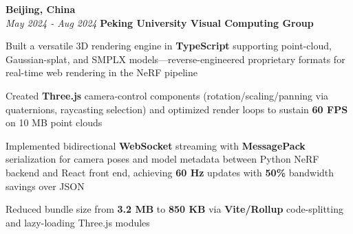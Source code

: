 \vspace{0.2cm}

\begin{twocolentry}{
    \textbf{Beijing, China} \\
    \textit{May 2024 - Aug 2024}
}{
    \textbf{Peking University Visual Computing Group} \\
}
\end{twocolentry}
\begin{onecolentry}
    \begin{highlights}
        \item Built a versatile 3D rendering engine in \textbf{TypeScript} supporting point-cloud, Gaussian-splat, and SMPLX models—reverse-engineered proprietary formats for real-time web rendering in the NeRF pipeline
        \item Created \textbf{Three.js} camera-control components (rotation/scaling/panning via quaternions, raycasting selection) and optimized render loops to sustain \textbf{60 FPS} on 10 MB point clouds
        \item Implemented bidirectional \textbf{WebSocket} streaming with \textbf{MessagePack} serialization for camera poses and model metadata between Python NeRF backend and React front end, achieving \textbf{60 Hz} updates with \textbf{50\%} bandwidth savings over JSON
        \item Reduced bundle size from \textbf{3.2 MB} to \textbf{850 KB} via \textbf{Vite/Rollup} code-splitting and lazy-loading Three.js modules
    \end{highlights}
\end{onecolentry}
